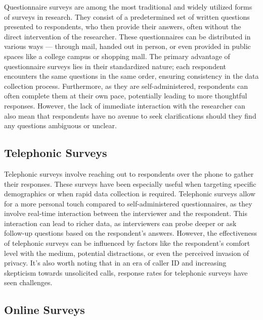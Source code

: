 \documentclass[
  b5paper]{book}
\begin{document}
Questionnaire surveys are among the most traditional and widely utilized forms of surveys in research. They consist of a predetermined set of written questions presented to respondents, who then provide their answers, often without the direct intervention of the researcher. These questionnaires can be distributed in various ways --- through mail, handed out in person, or even provided in public spaces like a college campus or shopping mall. The primary advantage of questionnaire surveys lies in their standardized nature; each respondent encounters the same questions in the same order, ensuring consistency in the data collection process. Furthermore, as they are self-administered, respondents can often complete them at their own pace, potentially leading to more thoughtful responses. However, the lack of immediate interaction with the researcher can also mean that respondents have no avenue to seek clarifications should they find any questions ambiguous or unclear.

\hypertarget{telephonic-surveys}{%
\subsection*{Telephonic Surveys}\label{telephonic-surveys}}

Telephonic surveys involve reaching out to respondents over the phone to gather their responses. These surveys have been especially useful when targeting specific demographics or when rapid data collection is required. Telephonic surveys allow for a more personal touch compared to self-administered questionnaires, as they involve real-time interaction between the interviewer and the respondent. This interaction can lead to richer data, as interviewers can probe deeper or ask follow-up questions based on the respondent's answers. However, the effectiveness of telephonic surveys can be influenced by factors like the respondent's comfort level with the medium, potential distractions, or even the perceived invasion of privacy. It's also worth noting that in an era of caller ID and increasing skepticism towards unsolicited calls, response rates for telephonic surveys have seen challenges.

\hypertarget{online-surveys}{%
\subsection*{Online Surveys}\label{online-surveys}}
\end{document}
